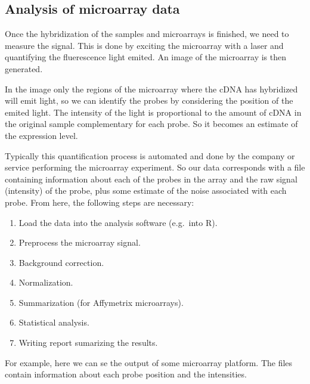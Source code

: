 \documentclass[]{book}
\providecommand{\tightlist}{%
  \setlength{\itemsep}{0pt}\setlength{\parskip}{0pt}}
\theoremstyle{definition}
\theoremstyle{definition}
\theoremstyle{definition}
\theoremstyle{remark}
\begin{document}
\subsection{Analysis of microarray
data}\label{analysis-of-microarray-data}

Once the hybridization of the samples and microarrays is finished, we
need to measure the signal. This is done by exciting the microarray with
a laser and quantifying the fluerescence light emited. An image of the
microarray is then generated.

In the image only the regions of the microarray where the cDNA has
hybridized will emit light, so we can identify the probes by considering
the position of the emited light. The intensity of the light is
proportional to the amount of cDNA in the original sample complementary
for each probe. So it becomes an estimate of the expression level.

Typically this quantification process is automated and done by the
company or service performing the microarray experiment. So our data
corresponds with a file containing information about each of the probes
in the array and the raw signal (intensity) of the probe, plus some
estimate of the noise associated with each probe. From here, the
following steps are necessary:

\begin{enumerate}
\def\labelenumi{\arabic{enumi}.}
\tightlist
\item
  Load the data into the analysis software (e.g.~into R).
\item
  Preprocess the microarray signal.
\item
  Background correction.
\item
  Normalization.
\item
  Summarization (for Affymetrix microarrays).
\item
  Statistical analysis.
\item
  Writing report sumarizing the results.
\end{enumerate}

For example, here we can se the output of some microarray platform. The
files contain information about each probe position and the intensities.
\end{document}
